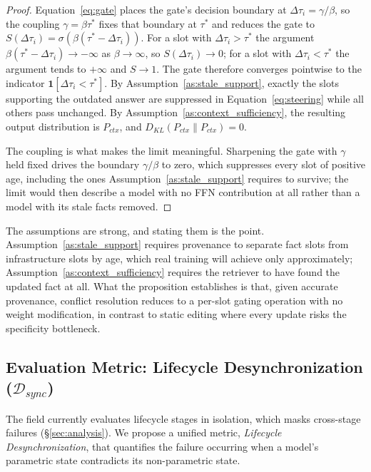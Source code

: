 \documentclass[10pt]{article}
\begin{document}
\begin{proof}
Equation~\ref{eq:gate} places the gate's decision boundary at $\Delta\tau_i = \gamma/\beta$, so the coupling $\gamma = \beta\tau^{\ast}$ fixes that boundary at $\tau^{\ast}$ and reduces the gate to $S(\Delta\tau_i) = \sigma\!\left(\beta(\tau^{\ast} - \Delta\tau_i)\right)$. For a slot with $\Delta\tau_i > \tau^{\ast}$ the argument $\beta(\tau^{\ast} - \Delta\tau_i) \to -\infty$ as $\beta \to \infty$, so $S(\Delta\tau_i) \to 0$; for a slot with $\Delta\tau_i < \tau^{\ast}$ the argument tends to $+\infty$ and $S \to 1$. The gate therefore converges pointwise to the indicator $\mathbf{1}\!\left[\Delta\tau_i < \tau^{\ast}\right]$. By Assumption~\ref{as:stale_support}, exactly the slots supporting the outdated answer are suppressed in Equation~\ref{eq:steering} while all others pass unchanged. By Assumption~\ref{as:context_sufficiency}, the resulting output distribution is $P_{ctx}$, and $D_{KL}(P_{ctx} \| P_{ctx}) = 0$.

The coupling is what makes the limit meaningful. Sharpening the gate with $\gamma$ held fixed drives the boundary $\gamma/\beta$ to zero, which suppresses every slot of positive age, including the ones Assumption~\ref{as:stale_support} requires to survive; the limit would then describe a model with no FFN contribution at all rather than a model with its stale facts removed.
\end{proof}

The assumptions are strong, and stating them is the point. Assumption~\ref{as:stale_support} requires provenance to separate fact slots from infrastructure slots by age, which real training will achieve only approximately; Assumption~\ref{as:context_sufficiency} requires the retriever to have found the updated fact at all. What the proposition establishes is that, given accurate provenance, conflict resolution reduces to a per-slot gating operation with no weight modification, in contrast to static editing where every update risks the specificity bottleneck.

\subsection{Evaluation Metric: Lifecycle Desynchronization (\texorpdfstring{$\mathcal{D}_{sync}$}{D\_sync})}
\label{sec:dsync}

The field currently evaluates lifecycle stages in isolation, which masks cross-stage failures (\S\ref{sec:analysis}). We propose a unified metric, \textit{Lifecycle Desynchronization}, that quantifies the failure occurring when a model's parametric state contradicts its non-parametric state.
\end{document}
